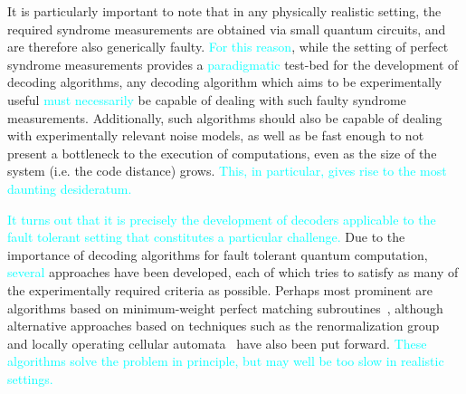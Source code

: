 \documentclass[twocolumn,preprintnumbers,amsmath,amssymb,notitlepage,nofootinbib,longbibliography,superscriptaddress,aps,pra,10pt]{revtex4-1}
\newcommand{\je}[1]{\textcolor{cyan}{#1}}
\begin{document}
	It is particularly important to note that in any physically realistic setting, the required syndrome measurements are obtained via small quantum circuits, and are therefore also generically faulty. 
	\je{For this reason}, while the setting of perfect syndrome measurements provides a \je{paradigmatic} 
	test-bed for the development of decoding algorithms, any decoding algorithm which aims to be experimentally useful 
	\je{must necessarily} 
	be capable of dealing with such faulty syndrome measurements.
	Additionally, such algorithms should also be capable of dealing with experimentally relevant noise models, as well as be fast enough to not present a bottleneck to the execution of computations, even as the size of the system (i.e. the code distance) grows. \je{This, in particular, gives rise to the most daunting desideratum.}

	\je{It turns out that it is precisely the development of decoders applicable to the fault tolerant setting that constitutes a particular challenge.} 
	Due to the importance of decoding algorithms for fault tolerant quantum computation, 
	\je{several}
	approaches have been developed, each of which tries to satisfy as many of the experimentally required criteria as possible.
	Perhaps most prominent are algorithms based on minimum-weight perfect matching subroutines~\cite{Fowler13}, although alternative approaches based on techniques such as the renormalization group~\cite{Duclos2010} and locally operating cellular automata~\cite{Herold15,herold2017cellular,Kubica2018} have also been put forward.
	\je{These algorithms solve the problem in principle, but may well be too slow in realistic settings.}
\end{document}
